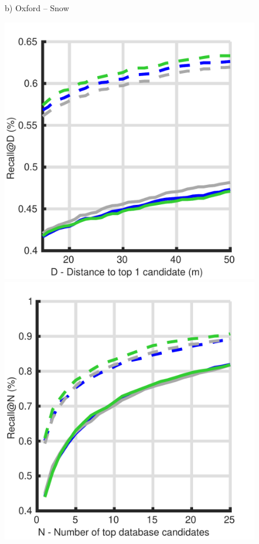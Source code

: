 \begin{figure}
\begin{minipage}{0.27\linewidth}
		b) Oxford -- Snow
	\end{minipage}
	
	\vspace{5pt}	
	
	\begin{minipage}{0.27\linewidth}
		\center \scriptsize
		\includegraphics[width=\linewidth]{plot/depth_vs_ref/Results_cmu_lt/distance}	
		
		\includegraphics[width=\linewidth]{plot/depth_vs_ref/Results_cmu_lt/recall}
		

\end{minipage}
\end{figure}
